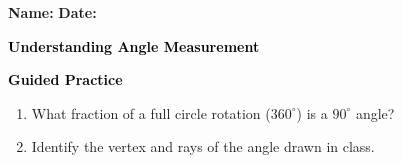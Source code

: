 \documentclass[12pt, letterpaper, fleqn]{article}
\begin{document}
\textbf{Name:} \underline{\hspace{5cm}}
\hfill
\textbf{Date:} \underline{\hspace{3cm}}\\

\begin{tcolorbox}[colback=customteal!20]
    \large\textcolor{black}{\textbf{Understanding Angle Measurement}}
\end{tcolorbox}
\newpage
\begin{tcolorbox}[colback=customteal!20]
    \large\textcolor{black}{\textbf{Guided Practice}}
\end{tcolorbox}
\begin{enumerate}[itemsep=3.5cm, leftmargin=0.6cm]
\item What fraction of a full circle rotation ($360^\circ$) is a $90^\circ$ angle?
\vspace{3cm}
\item Identify the vertex and rays of the angle drawn in class.
\end{enumerate}
\end{document}

